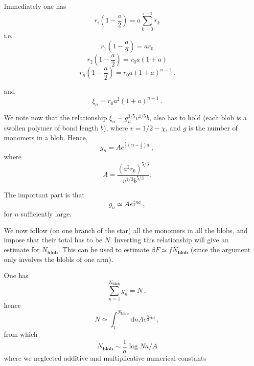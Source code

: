 \documentclass[a4paper,12pt,pre,superscriptaddress]{revtex4}
\begin{document}
Immediately one has 
\begin{displaymath}
  r_i \left(1 -\frac{a}{2} \right) = a \sum_{k=0}^{i-1} r_k
\end{displaymath}
i.e. 
\begin{displaymath}
  r_1 \left(1 -\frac{a}{2} \right) = a r_0
\end{displaymath}
\begin{displaymath}
  r_2 \left(1 -\frac{a}{2} \right) = r_0 a(1+a)
\end{displaymath}
\begin{displaymath}
  r_n \left(1 -\frac{a}{2} \right) = r_0 a (1+a)^{n-1} \ .
\end{displaymath}

and
\begin{displaymath}
  \xi_n = r_0 a^2 (1+a)^{n-1} \ .
\end{displaymath}

We note now that the relationship $\xi_n \sim g_n^{3/5} v^{1/5} b$,
also has to hold (each blob is a swollen polymer of bond length $b$),
where $v=1/2 - \chi$, and $g$ is the number of monomers in a
blob. Hence,
\begin{displaymath}
  g_n = A e^{\frac{5}{3}\left(n-\frac{1}{2}\right)a} \ ,  
\end{displaymath}
where
\begin{displaymath}
 A= \frac{(a^2 r_0)^{5/3}}{v^{1/3} b^{5/3}} . 
\end{displaymath}

The important part is that  
\begin{displaymath}
  g_n \simeq A e^{\frac{5}{3}n a} \ ,  
\end{displaymath}
for $n$ sufficiently large.

We now follow (on one branch of the star) all the monomers in all the
blobs, and impose that their total has to be $N$. Inverting this
relationship will give an estimate for $N_{\mathbf{blob}}$. This can
be used to estimate $\beta F \simeq f N_{\mathbf{blob}}$ (since the
argument only involves the blobls of one arm).

One has
\begin{displaymath}
  \sum_{n=1}^{N_{\mathbf{blob}}} g_n = N \ ,
\end{displaymath}
hence
\begin{displaymath}
  N \simeq \int_{1}^{N_{\mathbf{blob}}} \mathrm{d}n  A e^{\frac{5}{3}n
    a} \ , 
\end{displaymath}
from which
\begin{displaymath}
  N_{\mathbf{blob}} \sim \frac{1}{a} \log N a / A
\end{displaymath}
where we neglected additive and multiplicative numerical constants
\end{document}
